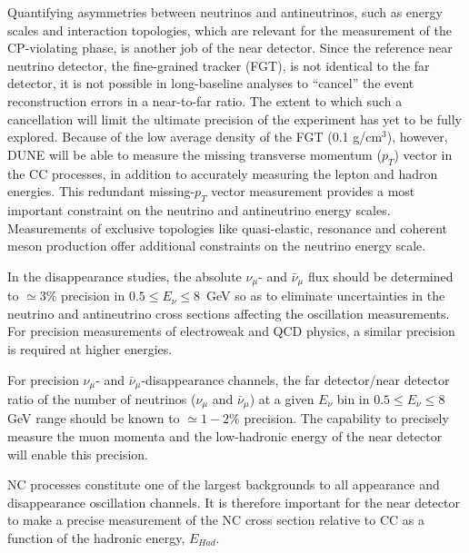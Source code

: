 Quantifying asymmetries between neutrinos and antineutrinos, such as 
energy scales and interaction topologies, which are relevant for the measurement of the CP-violating phase, is
another job of the near detector.
%
Since the reference near neutrino detector, the fine-grained tracker (FGT),  
is not identical to the far
 detector, it is not possible in long-baseline analyses to ``cancel'' the event reconstruction
 errors in a near-to-far ratio.  
The extent to which such a cancellation will limit the ultimate precision of the experiment has yet to
 be fully explored. 
Because of the low average density of the FGT (0.1 g/cm$^3$), however, DUNE will be able to 
measure the missing transverse momentum ($p_{T}$)  vector in the CC processes, in addition to accurately 
measuring the lepton and hadron energies.
This redundant missing-$p_{T}$ vector measurement provides a most important
constraint on the neutrino and antineutrino energy scales. Measurements of
exclusive topologies like quasi-elastic, resonance and
coherent meson production offer additional constraints on the neutrino energy scale. 


In the disappearance 
studies, the absolute $\nu_\mu$- and $\bar \nu_\mu$ flux should be determined to $\simeq 3\%$ precision in 
$0.5 \leq E_\nu \leq 8$~GeV so as to eliminate uncertainties in the neutrino 
and antineutrino cross sections affecting the oscillation measurements. For precision measurements of electroweak 
and QCD physics, a similar precision is required at higher energies. 


 
For precision $\nu_\mu$- and $\bar \nu_\mu$-disappearance  
channels, the far detector/near detector ratio of the number of neutrinos ($\nu_\mu$  and $\bar \nu_\mu$)
at a given $E_\nu$ bin in $0.5 \leq E_\nu \leq 8$ GeV range should be known
to $\simeq 1-2\%$ precision. The capability to precisely measure the muon momenta and 
the low-hadronic energy of the near detector will enable this precision. 


NC processes 
constitute one of the largest backgrounds to all appearance and disappearance oscillation 
channels. It is therefore important for the near detector to make a precise measurement of the NC cross section relative to 
CC as a function of the hadronic energy, $E_{Had}$. 


